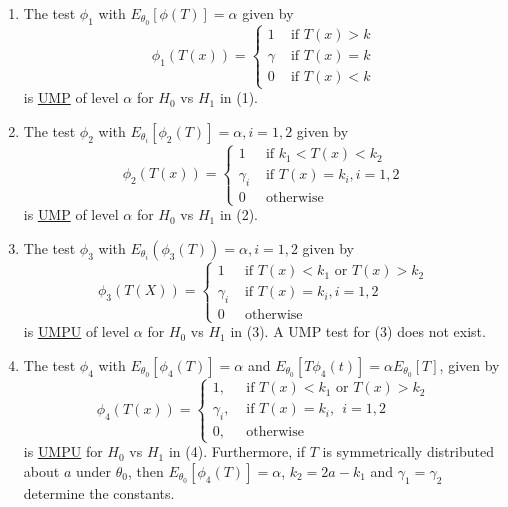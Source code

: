\documentclass[12pt]{article}
\numberwithin{equation}{section}
\begin{document}
\begin{enumerate}[(1)]
  \item The test $\phi_1$ with $E_{\theta_0}[\phi(T)] = \alpha$ given by
  \begin{equation*}
    \phi_1(T(x)) =
    \begin{cases}
      1      & \text{ if } T(x) > k \\
      \gamma & \text{ if } T(x) = k \\
      0      & \text{ if } T(x) < k
    \end{cases}
  \end{equation*}
  is \underline{UMP} of level $\alpha$ for $H_0$ vs $H_1$ in (1).
  \item The test $\phi_2$ with $E_{\theta_i}[\phi_2(T)] = \alpha, i = 1, 2$ given by
  \begin{equation*}
    \phi_2(T(x)) =
    \begin{cases}
      1         &\text{ if } k_1 < T(x) < k_2 \\
      \gamma_i  &\text{ if } T(x) = k_i, i = 1, 2 \\
      0         &\text{ otherwise}
    \end{cases}
  \end{equation*}
  is \underline{UMP} of level $\alpha$ for $H_0$ vs $H_1$ in (2). 
  \item The test $\phi_3$ with $E_{\theta_i}(\phi_3(T)) = \alpha, i = 1, 2$ given by
  \begin{equation*}
    \phi_3(T(X)) =
    \begin{cases}
      1        &\text{ if } T(x) < k_1 \text{ or } T(x) > k_2 \\
      \gamma_i &\text{ if } T(x) = k_i, i = 1, 2 \\
      0        &\text{ otherwise}
    \end{cases}
  \end{equation*}
  is \underline{UMPU} of level $\alpha$ for $H_0$ vs $H_1$ in (3). A UMP test for (3) does not exist. 
  \item The test $\phi_4$ with $E_{\theta_0}[\phi_4(T)] = \alpha$ and 
  $E_{\theta_0}[T\phi_4(t)] = \alpha E_{\theta_0}[T]$, given by
  \begin{equation*}
    \phi_4(T(x)) =
    \begin{cases}
      1,        &\text{ if } T(x) < k_1 \text{ or } T(x) > k_2 \\
      \gamma_i, &\text{ if } T(x) = k_i, \ \ i = 1, 2 \\
      0,        &\text{ otherwise}
    \end{cases}
  \end{equation*}
  is \underline{UMPU} for $H_0$ vs $H_1$ in (4). Furthermore, if $T$ is symmetrically distributed about $a$ under $\theta_0$, then $E_{\theta_0}[\phi_4(T)] = \alpha$, $k_2 = 2a - k_1$ and $\gamma_1 = \gamma_2$ determine the constants.
\end{enumerate}
\newpage
\end{document}
